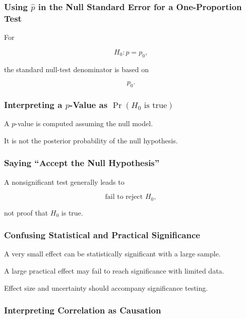 \subsubsection{Using \(\hat p\) in the Null Standard Error for a One-Proportion Test}

For

\[
H_0:p=p_0,
\]

the standard null-test denominator is based on

\[
\boxed{
p_0.
}
\]

\subsubsection{Interpreting a \(p\)-Value as \(\Pr(H_0\text{ is true})\)}

A \(p\)-value is computed assuming the null model.

It is not the posterior probability of the null hypothesis.

\subsubsection{Saying ``Accept the Null Hypothesis''}

A nonsignificant test generally leads to

\[
\boxed{
\text{fail to reject }H_0,
}
\]

not proof that \(H_0\) is true.

\subsubsection{Confusing Statistical and Practical Significance}

A very small effect can be statistically significant with a large sample.

A large practical effect may fail to reach significance with limited data.

Effect size and uncertainty should accompany significance testing.

\subsubsection{Interpreting Correlation as Causation}


